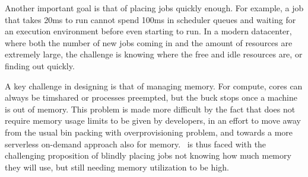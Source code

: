 Another important goal is that of placing jobs quickly enough. For example, a
job that takes 20ms to run cannot spend 100ms in scheduler queues and waiting
for an execution environment before even starting to run. In a modern
datacenter, where both the number of new jobs coming in and the amount of
resources are extremely large, the challenge is knowing where the free and idle
resources are, or finding out quickly.


A key challenge in designing \sys{} is that of managing memory. For compute,
cores can always be timshared or processes preempted, but the buck stops once a
machine is out of memory. This problem is made more difficult by the fact that
\sys{} does not require memory usage limits to be given by developers, in an
effort to move away from the usual bin packing with overprovisioning problem,
and towards a more serverless on-demand approach also for memory.~\Sys{} is thus
faced with the challenging proposition of blindly placing jobs not knowing how
much memory they will use, but still needing memory utilization to be high.



 
